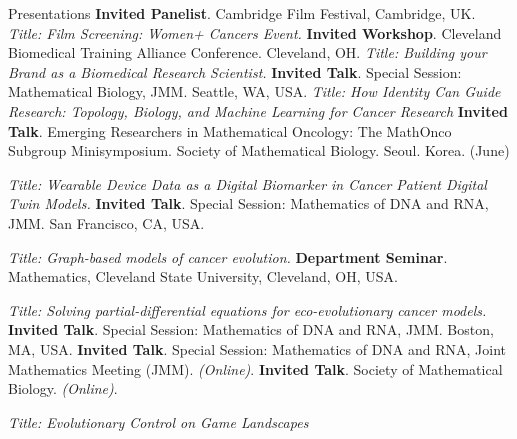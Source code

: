 \begin{rubric}{Presentations}
\entry*[2025] \textbf{Invited Panelist}. Cambridge Film Festival, Cambridge, UK. \textit{Title: Film Screening: Women+ Cancers Event.}
\entry*[2025] \textbf{Invited Workshop}. Cleveland Biomedical Training Alliance Conference. Cleveland, OH. \textit{Title: Building your Brand as a Biomedical Research Scientist.}
\entry*[2025] \textbf{Invited Talk}. Special Session: Mathematical Biology, JMM. Seattle, WA, USA.
\textit{Title: How Identity Can Guide Research: Topology, Biology, and Machine Learning for Cancer Research}
\entry*[2024] \textbf{Invited Talk}. Emerging Researchers in Mathematical Oncology: The MathOnco Subgroup Minisymposium. Society of Mathematical Biology. Seoul. Korea. (June) \par \textit{Title: Wearable Device Data as a Digital Biomarker in Cancer Patient Digital Twin Models.}
\entry*[2024] \textbf{Invited Talk}. Special Session: Mathematics of DNA and RNA, JMM. San Francisco, CA, USA. \par \textit{Title: Graph-based models of cancer evolution.}
\entry*[2023] \textbf{Department Seminar}. Mathematics, Cleveland State University, Cleveland, OH, USA. \par \textit{Title: Solving partial-differential equations for eco-evolutionary cancer models.}
\entry*[2023] \textbf{Invited Talk}. Special Session: Mathematics of DNA and RNA, JMM. Boston, MA, USA.
\entry*[2022] \textbf{Invited Talk}. Special Session: Mathematics of DNA and RNA, Joint Mathematics Meeting (JMM). \emph{(Online)}. 
\entry*[2021] \textbf{Invited Talk}. Society of Mathematical Biology. \emph{(Online)}.\par
\textit{Title: Evolutionary Control on Game Landscapes}




\end{rubric}
